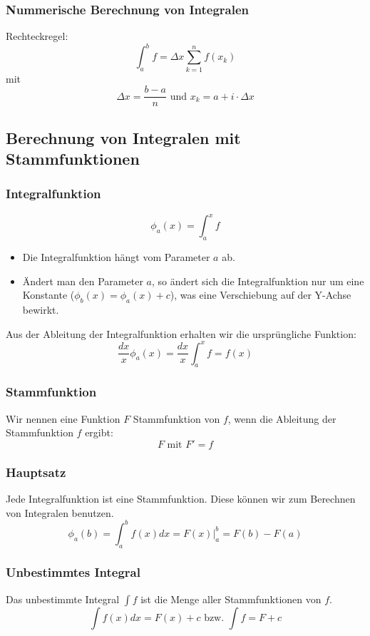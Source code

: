\subsubsection{Nummerische Berechnung von Integralen}
Rechteckregel:
\[ \int^b_a f =  \Delta x \sum_{k=1}^{n}f(x_k) \]
mit
\[ \Delta x = \frac{b-a}{n} \text{ und } x_k = a + i \cdot \Delta x \]

\subsection{Berechnung von Integralen mit Stammfunktionen}
\subsubsection{Integralfunktion}
\[ \phi_a(x) = \int_a^x f \]
\begin{itemize}
  \item Die Integralfunktion hängt vom Parameter $a$ ab.
  \item Ändert man den Parameter $a$, so ändert sich die
  Integralfunktion nur um eine Konstante ($\phi_b(x) = \phi_a(x) + c$),
  was eine Verschiebung auf der Y-Achse bewirkt.
\end{itemize}

Aus der Ableitung der Integralfunktion erhalten wir die ursprüngliche Funktion:
\[ \frac{dx}{x} \phi_a(x) = \frac{dx}{x} \int_a^x f = f(x) \]

\subsubsection{Stammfunktion}
Wir nennen eine Funktion $F$ Stammfunktion von $f$, wenn die Ableitung
der Stammfunktion $f$ ergibt:
\[F \text{ mit } F' = f\]
\subsubsection{Hauptsatz}
Jede Integralfunktion ist eine Stammfunktion. Diese können wir zum
Berechnen von Integralen benutzen.
\[\phi_a(b) = \int_a^b f(x)dx = F(x)|^b_a = F(b) - F(a) \]

\subsubsection{Unbestimmtes Integral}
Das unbestimmte Integral $\int f$ ist die Menge aller Stammfunktionen
von $f$.
\[ \int f(x) dx = F(x) + c \text{ bzw. } \int f = F + c\]

